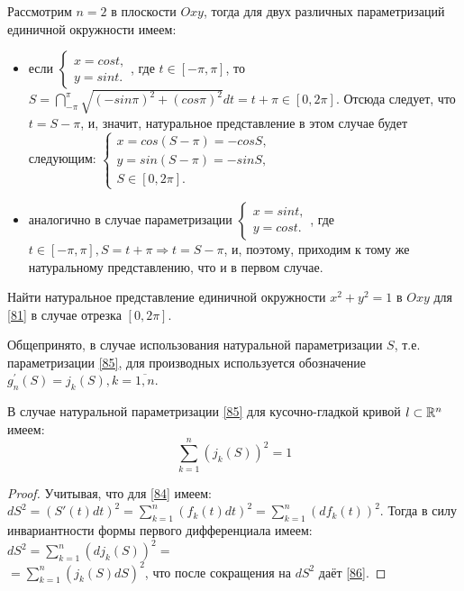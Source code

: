 \begin{example}
	Рассмотрим $n = 2$ в плоскости $Oxy$, тогда для двух различных параметризаций единичной окружности имеем:
	\begin{itemize}
		\item если $\begin{cases}
		x = cost, \\
		y = sint.
		\end{cases}$, где $t \in [-\pi, \pi]$, то $S = \dint\limits_{-\pi}^{\pi} \sqrt{(-sin \pi)^2 + (cos \pi)^2} dt = t + \pi \in [0, 2 \pi]$. Отсюда следует, что $t = S - \pi$, и, значит, натуральное представление в этом случае будет следующим:
		$\begin{cases}
		x = cos (S - \pi) = - cos S, \\
		y = sin (S - \pi) 	= - sin S, \\
		S \in [0, 2 \pi].
		\end{cases}$
		\item аналогично в случае параметризации $\begin{cases}
		x = sint, \\
		y = cost.
		\end{cases}$, где $t \in [-\pi, \pi], S = t + \pi \Rightarrow t = S - \pi$, и, поэтому, приходим к тому же натуральному представлению, что и в первом случае.
	\end{itemize}
\end{example}
\begin{exercise}
	Найти натуральное представление единичной окружности $x^2 + y^2 = 1$ в $Oxy$ для \eqref{81} в случае отрезка $[0, 2 \pi]$. 
\end{exercise}

Общепринято, в случае использования натуральной параметризации $S$, т.е. параметризации \eqref{85}, для производных используется обозначение $g_n^{'} (S) = j_k(S), k = \overline{1,n}$.

\begin{lemma}
	В случае натуральной параметризации \eqref{85} для кусочно-гладкой кривой $l \subset \mathbb{R}^n$ имеем:
	\begin{equation}
	\label{86}
	\sum\limits_{k=1}^{n} (j_k(S))^2 = 1
	\end{equation}
\end{lemma}
\begin{proof}
	Учитывая, что для \eqref{84} имеем: $dS^2 = (S'(t) dt)^2 = \sum\limits_{k=1}^{n} (f_k(t) dt)^2 = \sum\limits_{k=1}^{n} (d f_k (t))^2$. Тогда в силу инвариантности формы первого дифференциала имеем: $dS^2 = \sum\limits_{k=1}^{n} (d j_k (S))^2 =$ \\ $= \sum\limits_{k=1}^{n} (j_k(S) dS)^2$, что после сокращения на $dS^2$ даёт \eqref{86}. 
\end{proof}

